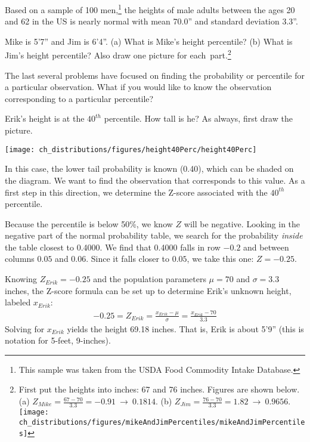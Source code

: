 Based on a sample of 100 men,\footnote{This sample was taken from the USDA Food Commodity Intake Database.} the heights of male adults between the ages 20 and 62 in the US is nearly normal with mean 70.0'' and standard deviation 3.3''.

\begin{exercise}
Mike is 5'7'' and Jim is 6'4''. (a) What is Mike's height percentile? (b) What is Jim's height percentile? Also draw one picture for each~part.\footnote{First put the heights into inches: 67 and 76 inches. Figures are shown below. (a) $Z_{Mike} = \frac{67 - 70}{3.3} = -0.91\ \to\ 0.1814$. (b) $Z_{Jim} = \frac{76 - 70}{3.3} = 1.82\ \to\ 0.9656$. \\\texttt{[image: ch\_distributions/figures/mikeAndJimPercentiles/mikeAndJimPercentiles]}}
\end{exercise}

The last several problems have focused on finding the probability or percentile for a particular observation. What if you would like to know the observation corresponding to a particular percentile?

\begin{example}{Erik's height is at the $40^{th}$ percentile. How tall is he?}\label{normalExam40Perc}
As always, first draw the picture.\vspace{-1mm}
\begin{center}
\texttt{[image: ch\_distributions/figures/height40Perc/height40Perc]}\vspace{-1mm}
\end{center}
In this case, the lower tail probability is known (0.40), which can be shaded on the diagram. We want to find the observation that corresponds to this value. As a first step in this direction, we determine the Z-score associated with the $40^{th}$ percentile.

Because the percentile is below 50\%, we know $Z$ will be negative. Looking in the negative part of the normal probability table, we search for the probability \emph{inside} the table closest to 0.4000. We find that 0.4000 falls in row $-0.2$ and between columns $0.05$ and $0.06$. Since it falls closer to $0.05$, we take this one: $Z=-0.25$.

Knowing $Z_{Erik}=-0.25$ and the population parameters $\mu=70$ and $\sigma=3.3$ inches, the Z-score formula can be set up to determine Erik's unknown height, labeled $x_{Erik}$:
\begin{eqnarray*}
-0.25 = Z_{Erik} = \frac{x_{Erik} - \mu}{\sigma} = \frac{x_{Erik} - 70}{3.3}
\end{eqnarray*}
Solving for $x_{Erik}$ yields the height 69.18 inches. That is, Erik is about 5'9'' (this is notation for 5-feet, 9-inches).
\end{example}


